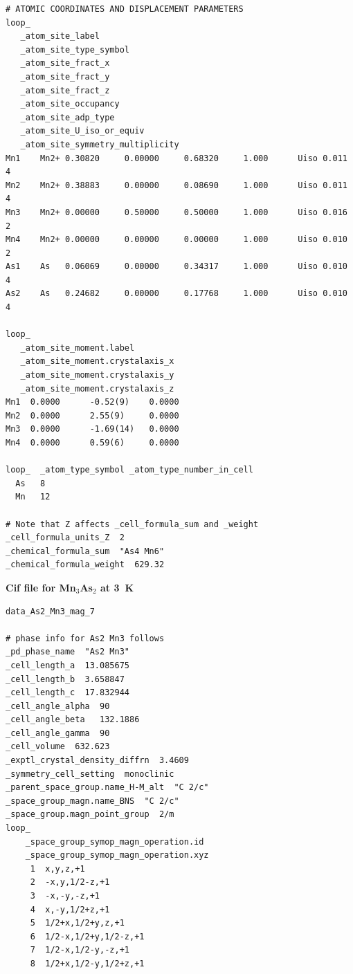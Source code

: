 \documentclass[letterpaper,10pt,doublespacing,edeposit]{uiucthesis2020}
\begin{document}
\begin{mainmatter}
\begin{verbatim}
# ATOMIC COORDINATES AND DISPLACEMENT PARAMETERS
loop_ 
   _atom_site_label
   _atom_site_type_symbol
   _atom_site_fract_x
   _atom_site_fract_y
   _atom_site_fract_z
   _atom_site_occupancy
   _atom_site_adp_type
   _atom_site_U_iso_or_equiv
   _atom_site_symmetry_multiplicity
Mn1    Mn2+ 0.30820     0.00000     0.68320     1.000      Uiso 0.011      4   
Mn2    Mn2+ 0.38883     0.00000     0.08690     1.000      Uiso 0.011      4   
Mn3    Mn2+ 0.00000     0.50000     0.50000     1.000      Uiso 0.016      2   
Mn4    Mn2+ 0.00000     0.00000     0.00000     1.000      Uiso 0.010      2   
As1    As   0.06069     0.00000     0.34317     1.000      Uiso 0.010      4   
As2    As   0.24682     0.00000     0.17768     1.000      Uiso 0.010      4   

loop_
   _atom_site_moment.label
   _atom_site_moment.crystalaxis_x
   _atom_site_moment.crystalaxis_y
   _atom_site_moment.crystalaxis_z
Mn1  0.0000      -0.52(9)    0.0000      
Mn2  0.0000      2.55(9)     0.0000      
Mn3  0.0000      -1.69(14)   0.0000      
Mn4  0.0000      0.59(6)     0.0000      

loop_  _atom_type_symbol _atom_type_number_in_cell
  As   8
  Mn   12

# Note that Z affects _cell_formula_sum and _weight
_cell_formula_units_Z  2
_chemical_formula_sum  "As4 Mn6"
_chemical_formula_weight  629.32

\end{verbatim}

\vspace{1em}
\begin{center}
\textbf{Cif file for Mn$_3$As$_2$ at 3~K}\\
\end{center}
\normalsize

\begin{verbatim}
data_As2_Mn3_mag_7

# phase info for As2 Mn3 follows
_pd_phase_name  "As2 Mn3"
_cell_length_a  13.085675
_cell_length_b  3.658847
_cell_length_c  17.832944
_cell_angle_alpha  90
_cell_angle_beta   132.1886
_cell_angle_gamma  90
_cell_volume  632.623
_exptl_crystal_density_diffrn  3.4609
_symmetry_cell_setting  monoclinic
_parent_space_group.name_H-M_alt  "C 2/c"
_space_group_magn.name_BNS  "C 2/c"
_space_group.magn_point_group  2/m
loop_
    _space_group_symop_magn_operation.id
    _space_group_symop_magn_operation.xyz
     1  x,y,z,+1
     2  -x,y,1/2-z,+1
     3  -x,-y,-z,+1
     4  x,-y,1/2+z,+1
     5  1/2+x,1/2+y,z,+1
     6  1/2-x,1/2+y,1/2-z,+1
     7  1/2-x,1/2-y,-z,+1
     8  1/2+x,1/2-y,1/2+z,+1


\end{verbatim}
\end{mainmatter}
\end{document}
